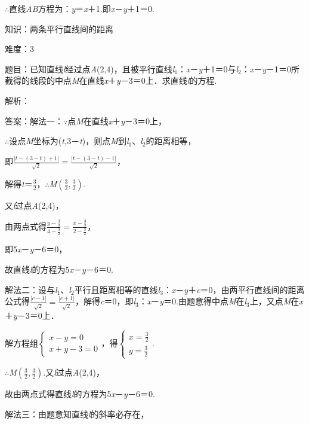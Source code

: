 \documentclass{article} %
\begin{document}
$\mathrm{\therefore}$直线\textit{AB}方程为：\textit{y}＝\textit{x}＋1.即\textit{x}－\textit{y}＋1＝0.

知识：两条平行直线间的距离

难度：3

题目：已知直线\textit{l}经过点\textit{A}(2,4)，且被平行直线\textit{l}${}_{1}$：\textit{x}－\textit{y}＋1＝0与\textit{l}${}_{2}$：\textit{x}－\textit{y}－1＝0所截得的线段的中点\textit{M}在直线\textit{x}＋\textit{y}－3＝0上．求直线\textit{l}的方程.

解析：

答案：解法一：$\mathrm{\because}$点\textit{M}在直线\textit{x}＋\textit{y}－3＝0上，

$\mathrm{\therefore}$设点\textit{M}坐标为(\textit{t,}3－\textit{t})，则点\textit{M}到\textit{l}${}_{1}$、\textit{l}${}_{2}$的距离相等，

即$\frac{|t-(3-t)+1|}{\sqrt{2}}=\frac{|t-(3-t)-1|}{\sqrt{2}}$，

解得\textit{t}＝$\frac{3}{2}$，$\mathrm{\therefore}$\textit{M}$(\frac{3}{2}, \frac{3}{2})$.

又\textit{l}过点\textit{A}(2,4)，

由两点式得$\frac{y-\frac{3}{2}}{4-\frac{3}{2}}=\frac{x-\frac{3}{2}}{2-\frac{3}{2}}$，

即5\textit{x}－\textit{y}－6＝0，

故直线\textit{l}的方程为5\textit{x}－\textit{y}－6＝0.

解法二：设与\textit{l}${}_{1}$、\textit{l}${}_{2}$平行且距离相等的直线\textit{l}${}_{3}$：\textit{x}－\textit{y}＋\textit{c}＝0，由两平行直线间的距离公式得$\frac{|c-1|}{\sqrt{2}}=\frac{|c+1|}{\sqrt{2}}$，解得\textit{c}＝0，即\textit{l}${}_{3}$：\textit{x}－\textit{y}＝0.由题意得中点\textit{M}在\textit{l}${}_{3}$上，又点\textit{M}在\textit{x}＋\textit{y}－3＝0上．

解方程组$\left\{\begin{array}{l} x-y=0\\ x+y-3=0 \end{array}\right.$，得$\left\{\begin{array}{l} x=\frac{3}{2}\\ y=\frac{3}{2} \end{array}\right.$.

$\mathrm{\therefore}$\textit{M}$(\frac{3}{2}, \frac{3}{2})$.又\textit{l}过点\textit{A}(2,4)，

故由两点式得直线\textit{l}的方程为5\textit{x}－\textit{y}－6＝0.

解法三：由题意知直线\textit{l}的斜率必存在，
\end{document}
